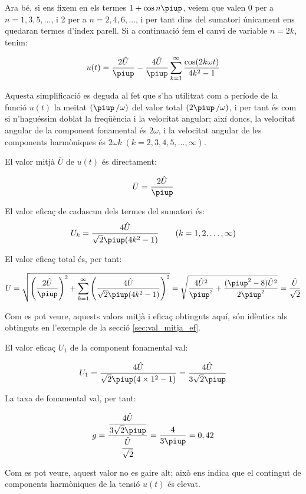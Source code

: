 \begin{exemple}
    Ara bé, si ens fixem en els termes $1+\cos n \piup$, veiem que valen 0
    per a $n=1,3,5,\ldots$, i 2 per a $n=2,4,6,\ldots$, i per tant dins
    del sumatori únicament ens quedaran termes d'índex parell. Si a
    continuació fem el canvi de variable $n=2k$, tenim:

    \[
    u(t) = \frac{2\hat{U}}{\piup} - \frac{4\hat{U}}{\piup} \sum_{k=1}^\infty
          \frac{\cos(2 k \omega t)}{4k^2-1}
    \]

    Aquesta simplificació es deguda al fet que s'ha utilitzat com a
    període de la funció $u(t)$ la meitat $(\piup\,/\omega)$ del valor total
    $(2\piup\,/\omega)$, i per tant és com si n'haguéssim doblat la
    freqüència i la velocitat angular; així doncs, la velocitat angular
    de la component fonamental és $2\omega$, i la velocitat angular de
    les components harmòniques és $2\omega k \;(k=2,3,4,5,\ldots,\infty)$.

    El valor mitjà $\bar{U}$ de $u(t)$ és directament:

    \[
        \bar{U} = \frac{2\hat{U}}{\piup}
    \]

    El valor eficaç de cadascun dels termes del sumatori és:
    \[
        U_k =\frac{4\hat{U}}{\sqrt{2}\piup(4k^2-1)}
        \qquad(k=1,2,\ldots,\infty)
    \]

    El valor eficaç total és, per tant:

    \[
        U=\sqrt{\left(\frac{2\hat{U}}{\piup}\right)^2 + \sum_{k=1}^\infty
        \left(\frac{4\hat{U}}{\sqrt{2}\piup(4k^2-1)}\right)^2} =
        \sqrt{\frac{4\hat{U}^2}{\piup^2} + \frac{(\piup^2-8)\hat{U}^2}{2\piup^2}
        }= \frac{\hat{U}}{\sqrt{2}}
    \]

    Com es pot veure, aquests valors mitjà i eficaç obtinguts aquí, són
    idèntics als obtinguts en l'exemple de la secció
    \ref{sec:val_mitja_ef}.

    El valor eficaç $U_1$ de la component fonamental val:

    \[
        U_1 =\frac{4\hat{U}}{\sqrt{2}\piup(4\times 1^2-1)} =
        \frac{4\hat{U}}{3\sqrt{2}\piup}
    \]

    La taxa de fonamental val, per tant:

    \[
        g =
        \frac{\dfrac{4\hat{U}}{3\sqrt{2}\piup}}{\dfrac{\hat{U}}{\sqrt{2}}}
        =\frac{4}{3\piup} = 0,{42}
    \]

    Com es pot veure, aquest valor no es gaire alt; això ens indica que
    el contingut de components harmòniques de la tensió $u(t)$ és
    elevat.
\end{exemple}


